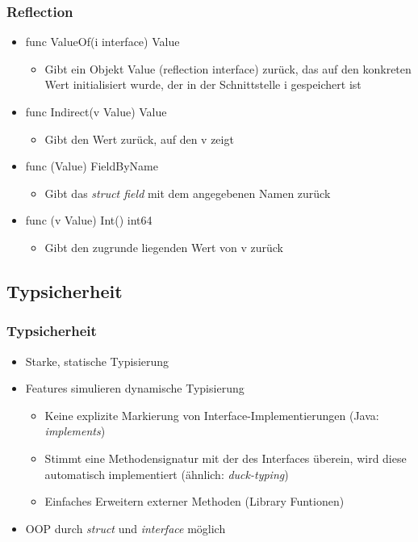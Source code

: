 \documentclass{beamer}
\begin{document}
\begin{frame}
\frametitle{Reflection}

\begin{itemize}
\setlength{\itemsep}{24pt}
\item func ValueOf(i interface{}) Value
\begin{itemize}
\item Gibt ein Objekt Value (reflection interface) zurück, das auf den konkreten Wert initialisiert wurde, der in der Schnittstelle i gespeichert ist
\end{itemize}
\item func Indirect(v Value) Value
\begin{itemize}
\item Gibt den Wert zurück, auf den v zeigt
\end{itemize}
\item func (Value) FieldByName
\begin{itemize}
\item Gibt das \textit{struct field} mit dem angegebenen Namen zur\"uck
\end{itemize}
\item func (v Value) Int() int64
\begin{itemize}
\item Gibt den zugrunde liegenden Wert von v zur\"uck
\end{itemize}
\end{itemize}

\end{frame}

\subsection{Typsicherheit}
\begin{frame}
\frametitle{Typsicherheit}

\begin{itemize}
\setlength{\itemsep}{24pt}
\item Starke, statische Typisierung
\item Features simulieren dynamische Typisierung
\begin{itemize}
\setlength{\itemsep}{12pt}
\item Keine explizite Markierung von Interface-Implementierungen (Java: \textit{implements})
\item Stimmt eine Methodensignatur mit der des Interfaces \"uberein, wird diese automatisch implementiert (\"ahnlich: \textit{duck-typing})
\item Einfaches Erweitern externer Methoden (Library Funtionen)
\end{itemize}
\item OOP durch \textit{struct} und \textit{interface} m\"oglich
\end{itemize}

\end{frame}
\end{document}
